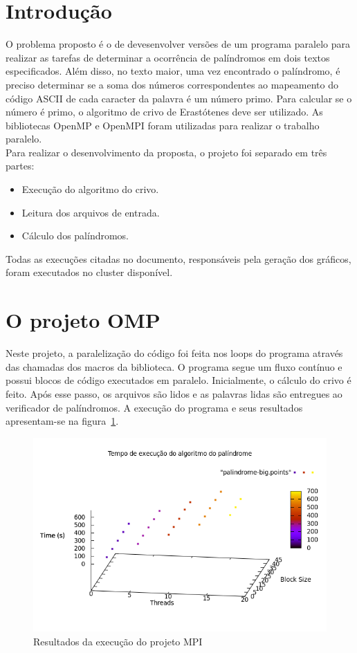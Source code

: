 \documentclass[a4paper]{article}
\begin{document}
\section{Introdução}
\indent \indent O problema proposto é o de devesenvolver versões de um programa paralelo para realizar as tarefas de determinar a ocorrência de palíndromos em dois textos especificados. Além disso, no texto maior, uma vez encontrado o palíndromo, é preciso determinar se a soma dos números correspondentes ao mapeamento do código ASCII de cada caracter da palavra é um número primo. Para calcular se o número é primo, o algoritmo de crivo de Erastótenes deve ser utilizado. As bibliotecas OpenMP e OpenMPI foram utilizadas para realizar o trabalho paralelo.\\
\indent Para realizar o desenvolvimento da proposta, o projeto foi separado em três partes:
\begin{itemize}
	\item Execução do algoritmo do crivo.
	\item Leitura dos arquivos de entrada.
	\item Cálculo dos palíndromos.
\end{itemize}
\indent \indent Todas as execuções citadas no documento, responsáveis pela geração dos gráficos, foram executados no cluster disponível.

\section{O projeto OMP}
\indent \indent Neste projeto, a paralelização do código foi feita nos loops do programa através das chamadas dos macros da biblioteca. O programa segue um fluxo contínuo e possui blocos de código executados em paralelo. Inicialmente, o cálculo do crivo é feito. Após esse passo, os arquivos são lidos e as palavras lidas são entregues ao verificador de palíndromos. A execução do programa e seus resultados apresentam-se na figura~\ref{graph-omp}.
\begin{figure}[float=p]
	\includegraphics[scale=0.5]{graph-omp}
	\caption{Resultados da execução do projeto MPI}
	\label{graph-omp}
\end{figure}
\end{document}
